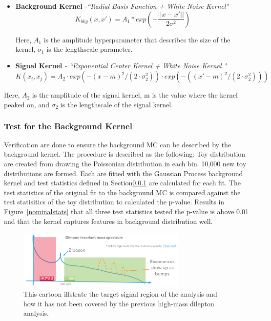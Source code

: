 \begin{itemize}
    \item \textbf{Background Kernel} \textit{-``Radial Basis Function + White Noise Kernel"}
        \begin{equation}
                K_{bkg}(x, x') = A_{1} * exp(-\frac{||x-x'||}{2\sigma^{2}}) 
        \label{eq:backgroundkernel}
        \end{equation}

    Here, $A_{1}$ is the amplitude hyperparameter that describes the size of the kernel, $\sigma_{1}$ is the lengthscale parameter.
\item \textbf{Signal Kernel} \textit{- ``Exponential Center Kernel + White Noise Kernel "}
            \begin{equation}
            K(x_{i}, x_{j})=A_{2}\cdot exp(-(x-m)^{2}/(2\cdot\sigma_{2}^{2}))\cdot exp(-((x'-m)^{2}/(2\cdot\sigma_{2}^{2})))
            \label{eq:signalkernel}
            \end{equation}
\end{itemize}

    Here, $A_{2}$ is the amplitude of the signal kernel, m is the value where the kernel peaked on, and $\sigma_{2}$ is the lengthscale of the signal kernel. 

\subsubsection{Test for the Background Kernel}
Verification are done to ensure the background MC can be described by the background kernel. The procedure is described as the following: Toy distribution are created from drawing the Poissonian distribution in each bin. 10,000 new toy distributions are formed. Each are fitted with the Gaussian Process background kernel and test statistics defined in Section\ref{} are calculated for each fit. The test statistics of the original fit to the background MC is compared against the test statisitics of
the toy distribution to calculated the p-value. Results in Figure~\ref{nominalstats} that all three test statistics tested the p-value is above 0.01 and that the kernel captures features in background distribution well. 

\begin{figure}[!htb]
    \begin{center}
        \includegraphics[width=0.75\textwidth]{figures/chapter_dimuon/dimuonStudies}        
        \caption{
        This cartoon illstrate the target signal region of the analysis and how it has not been covered by the previous high-mass dilepton analysis. }
            \label{fig:dimuonstudies}
    \end{center}
\end{figure}


